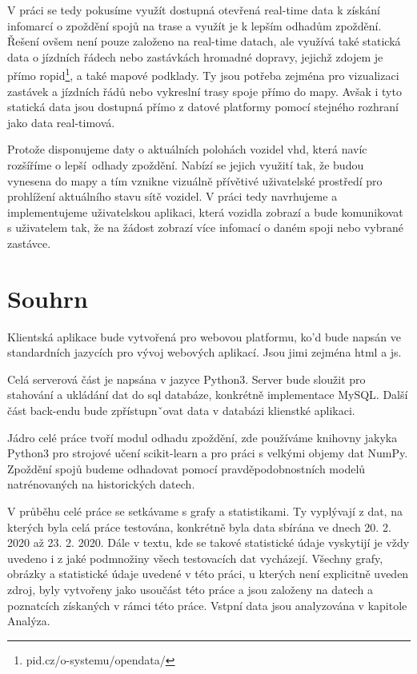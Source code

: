 \bigbreak

V práci se tedy pokusíme využít dostupná otevřená real-time data k získání infomarcí o zpoždění spojů na trase a využít je k lepším odhadům zpoždění. Řešení ovšem není pouze založeno na real-time datach, ale využívá také statická data o jízdních řádech nebo zastávkách hromadné dopravy, jejichž zdojem je přímo \gls{ropid}\footnote{pid.cz/o-systemu/opendata/}, a také mapové podklady. Ty jsou potřeba zejména pro vizualizaci zastávek a jízdních řádů nebo vykreslní trasy spoje přímo do mapy. Avšak i tyto statická data jsou dostupná přímo z datové platformy pomocí stejného rozhraní jako data real-timová.

\bigbreak

Protože disponujeme daty o aktuálních polohách vozidel \gls{vhd}, která navíc rozšíříme o lepší odhady zpoždění. Nabízí se jejich využití tak, že budou vynesena do mapy a tím vznikne vizuálně přívětivé uživatelské prostředí pro prohlížení aktuálního stavu sítě vozidel. V práci tedy navrhujeme a implementujeme uživatelskou aplikaci, která vozidla zobrazí a bude komunikovat s uživatelem tak, že na žádost zobrazí více infomací o daném spoji nebo vybrané zastávce.

\section*{Souhrn}

Klientská aplikace bude vytvořená pro webovou platformu, ko'd bude napsán ve standardních jazycích pro vývoj webových aplikací. Jsou jimi zejména \gls{html} a \gls{js}.

\bigbreak

Celá serverová část je napsána v jazyce Python3. Server bude sloužit pro stahování a ukládání dat do \gls{sql} databáze, konkrétně implementace MySQL. Další část back-endu bude zpřístupnˇovat data v databázi klienstké aplikaci.

\bigbreak

Jádro celé práce tvoří modul odhadu zpoždění, zde používáme knihovny jakyka Python3 pro strojové učení scikit-learn a pro práci s velkými objemy dat NumPy. Zpoždění spojů budeme odhadovat pomocí pravděpodobnostních modelů natrénovaných na historických datech.

\bigbreak

V průběhu celé práce se setkávame s grafy a statistikami. Ty vyplývají z dat, na kterých byla celá práce testována, konkrétně byla data sbírána ve dnech 20. 2. 2020 až 23. 2. 2020. Dále v textu, kde se takové statistické údaje vyskytijí je vždy uvedeno i z jaké podmnožiny všech testovacích dat vycházejí. Všechny grafy, obrázky a statistické údaje uvedené v této práci, u kterých není explicitně uveden zdroj, byly vytvořeny jako usoučást této práce a jsou založeny na datech a poznatcích získaných v rámci této práce. Vstpní data jsou analyzována v kapitole Analýza.

